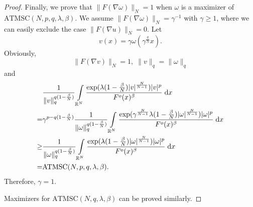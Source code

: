 \documentclass[10pt,a4paper]{amsart}
\newcommand{\R}{\mathbb{R}}
\begin{document}
\begin{proof}
Finally, we prove that $\|F(\nabla\omega)\|_{N}=1$ when $\omega$ is a maximizer of $\mathrm{ATMSC}(N,p,q,\lambda,\beta)$. We assume $\|F(\nabla\omega)\|_{N}=\gamma^{-1}$ with $\gamma\geq1$, where we can easily exclude the case $\|F(\nabla u)\|_{N}=0$. Let
$$
v(x)=\gamma\omega(\gamma^{\frac{q}{N}}x).
$$
Obviously,
$$
\|F(\nabla v)\|_{N}=1,\;\|v\|_{q}=\|\omega\|_{q}
$$
and
\begin{align}
    &\frac{1}{\|v\|_{q}^{q(1-\frac{\beta}{N})}}\int\limits_{\R^{N}}\frac{\exp(\lambda(1-\frac{\beta}{N})\lvert v\rvert^{\frac{N}{N-1}})\lvert v\rvert^{p}}{F^{o}(x)^{\beta}}\;\mathrm{d}x\notag\\
    =&\gamma^{p-q(1-\frac{\beta}{N})}\frac{1}{\|\omega\|_{q}^{q(1-\frac{\beta}{N})}}\int\limits_{\R^{N}}\frac{\exp(\gamma^{\frac{N}{N-1}}\lambda(1-\frac{\beta}{N})\lvert \omega\rvert^{\frac{N}{N-1}})\lvert \omega\rvert^{p}}{F^{o}(x)^{\beta}}\;\mathrm{d}x\notag\\
    \geq&\frac{1}{\|\omega\|_{q}^{q(1-\frac{\beta}{N})}}\int\limits_{\R^{N}}\frac{\exp(\lambda(1-\frac{\beta}{N})\lvert \omega\rvert^{\frac{N}{N-1}})\lvert \omega\rvert^{p}}{F^{o}(x)^{\beta}}\;\mathrm{d}x\notag\\
    =&\mathrm{ATMSC}(N,p,q,\lambda,\beta)\notag.
\end{align}
Therefore, $\gamma=1$.

Maximizers for $\mathrm{ATMSC}(N,q,\lambda,\beta)$ can be proved similarly.
\end{proof}
\end{document}
